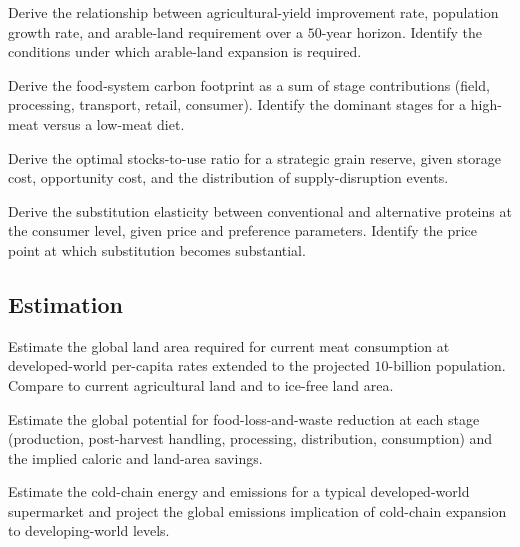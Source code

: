 \begin{exercise}
Derive the relationship between agricultural-yield improvement rate, population growth rate, and arable-land requirement over a $50$-year horizon. Identify the conditions under which arable-land expansion is required.
\end{exercise}

\begin{exercise}
Derive the food-system carbon footprint as a sum of stage contributions (field, processing, transport, retail, consumer). Identify the dominant stages for a high-meat versus a low-meat diet.
\end{exercise}

\begin{exercise}
Derive the optimal stocks-to-use ratio for a strategic grain reserve, given storage cost, opportunity cost, and the distribution of supply-disruption events.
\end{exercise}

\begin{exercise}
Derive the substitution elasticity between conventional and alternative proteins at the consumer level, given price and preference parameters. Identify the price point at which substitution becomes substantial.
\end{exercise}

\subsection*{Estimation}

\begin{exercise}
Estimate the global land area required for current meat consumption at developed-world per-capita rates extended to the projected $10$-billion population. Compare to current agricultural land and to ice-free land area.
\end{exercise}

\begin{exercise}
Estimate the global potential for food-loss-and-waste reduction at each stage (production, post-harvest handling, processing, distribution, consumption) and the implied caloric and land-area savings.
\end{exercise}

\begin{exercise}
Estimate the cold-chain energy and emissions for a typical developed-world supermarket and project the global emissions implication of cold-chain expansion to developing-world levels.
\end{exercise}

